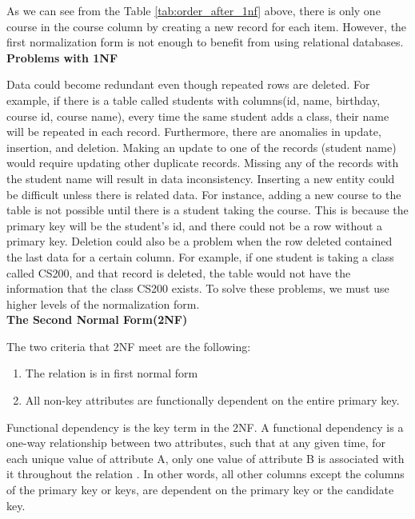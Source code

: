 

As we can see from the Table \ref{tab:order_after_1nf} above, there is only one course in the course column by creating a new record for each item.
However, the first normalization form is not enough to benefit from using relational databases.\\

\textbf{Problems with 1NF}

Data could become redundant even though repeated rows are deleted. 
For example, if there is a table called students with columns(id, name, birthday, course id, course name), every time the same student adds a class, 
their name will be repeated in each record. Furthermore, there are anomalies in update, insertion, and deletion. 
Making an update to one of the records (student name) 
would require updating other duplicate records. Missing any of the records with the student name will result in data inconsistency. 
Inserting a new entity could be difficult unless there is related data. For instance, adding a new course to the table is not possible until
there is a student taking the course. This is because the primary key will be the student’s id, and there could not be a row without a primary key. 
Deletion could also be a problem when the row deleted contained the last data for a certain column. For example, 
if one student is taking a class called CS200, and that record is deleted, the table would not have the information that the class CS200 exists. 
To solve these problems, we must use higher levels of the normalization form.\\


\textbf{The Second Normal Form(2NF)}

The two criteria that 2NF meet are the following:
\begin{enumerate}
    \item The relation is in first normal form
    \item All non-key attributes are functionally dependent on the entire primary key. 
\end{enumerate}


Functional dependency is the key term in the 2NF. A functional dependency is a one-way relationship between two attributes, 
such that at any given time, for each unique value of attribute A, only one value of attribute B is associated with it throughout the relation \cite{Harrington_2016}.
In other words, all other columns except the columns of the primary key or keys, are dependent on the primary key or the candidate key.

